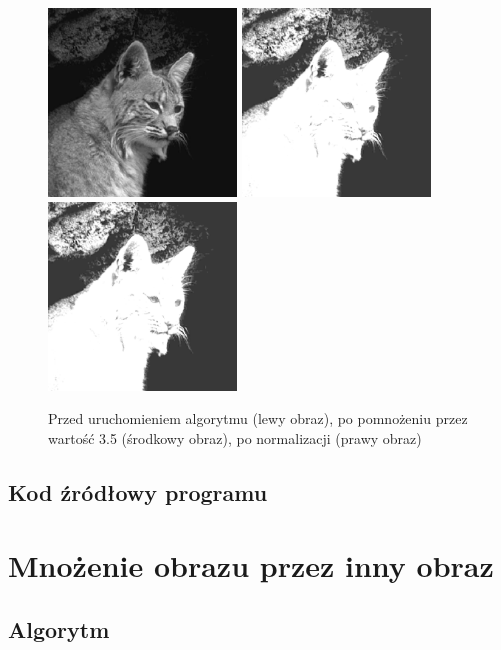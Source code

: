 \documentclass[a4paper,12pt]{book}
\begin{document}
\begin{figure}[H]
	\caption{Przed uruchomieniem algorytmu (lewy obraz), po pomnożeniu przez wartość 3.5 (środkowy obraz), po normalizacji (prawy obraz)}
	\includegraphics[width=5cm, height=5cm]{cat-unmodified.jpg}
	\includegraphics[width=5cm, height=5cm]{2-2/multiply-gray-const-cat-35.png}
	\includegraphics[width=5cm, height=5cm]{2-2/multiply-gray-const-cat-35-norm.png}
\end{figure}

\subsection*{Kod źródłowy programu}

\section{Mnożenie obrazu przez inny obraz}
\subsection*{Algorytm}
\end{document}
